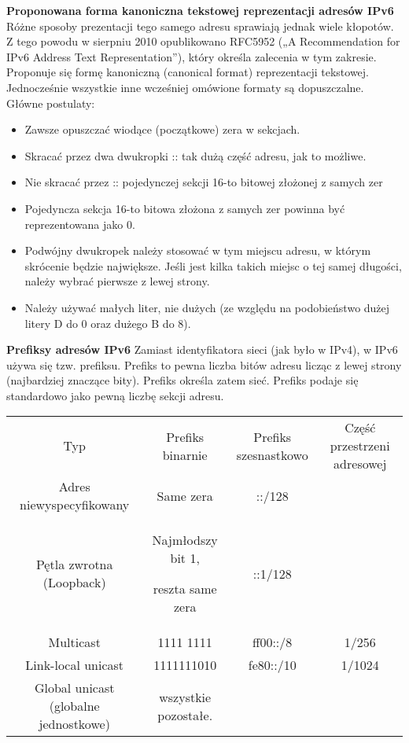     \textbf{Proponowana forma kanoniczna tekstowej reprezentacji adresów IPv6}
    Różne sposoby prezentacji tego samego adresu sprawiają jednak wiele kłopotów. Z tego
    powodu w sierpniu 2010 opublikowano RFC5952 („A Recommendation for IPv6 Address Text
    Representation”), który określa zalecenia w tym zakresie. Proponuje się formę kanoniczną
    (canonical format) reprezentacji tekstowej. Jednocześnie wszystkie inne wcześniej
    omówione formaty są dopuszczalne.
    Główne postulaty:
    \begin{itemize}
        \item Zawsze opuszczać wiodące (początkowe) zera w sekcjach.
        \item Skracać przez dwa dwukropki :: tak dużą część adresu, jak to możliwe.
        \item Nie skracać przez :: pojedynczej sekcji 16-to bitowej złożonej z samych zer
        \item Pojedyncza sekcja 16-to bitowa złożona z samych zer powinna być reprezentowana
        jako 0.
        \item Podwójny dwukropek należy stosować w tym miejscu adresu, w którym skrócenie będzie
        największe. Jeśli jest kilka takich miejsc o tej samej długości, należy wybrać pierwsze z
        lewej strony.
        \item Należy używać małych liter, nie dużych (ze względu na podobieństwo dużej litery D do 0
        oraz dużego B do 8).
    \end{itemize}



    \textbf{Prefiksy adresów IPv6}
    Zamiast identyfikatora sieci (jak było w IPv4), w IPv6 używa się tzw. prefiksu. Prefiks to
    pewna liczba bitów adresu licząc z lewej strony (najbardziej znaczące bity). Prefiks określa
    zatem sieć. Prefiks podaje się standardowo jako pewną liczbę sekcji adresu.

    \begin{tabular}{c|c|c|c}
        Typ & Prefiks binarnie & Prefiks szesnastkowo &
        Część przestrzeni adresowej\\

        Adres niewyspecyfikowany & Same zera & ::/128 &\\

        Pętla zwrotna (Loopback) & Najmłodszy bit 1,

        reszta same zera & ::1/128 &\\

        Multicast & 1111 1111 & ff00::/8 & 1/256\\

        Link-local unicast & 1111111010 & fe80::/10 & 1/1024\\
        Global unicast
        (globalne
        jednostkowe) & wszystkie pozostałe.
    \end{tabular}

